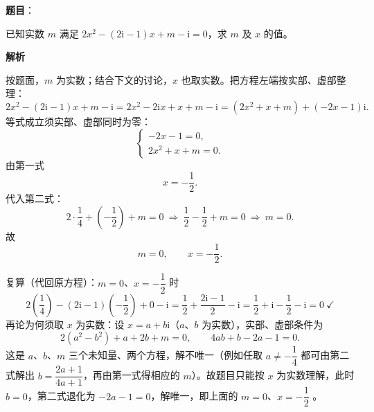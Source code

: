 \begin{answer}

\textbf{题目}：

已知实数 $m$ 满足 $2x^2-(2\mathrm i-1)x+m-\mathrm i=0$，求 $m$ 及 $x$ 的值。

\textbf{解析}

按题面，$m$ 为实数；结合下文的讨论，$x$ 也取实数。把方程左端按实部、虚部整理：
\nopagebreak[4]
\[
2x^2-(2\mathrm i-1)x+m-\mathrm i
=2x^2-2\mathrm i x+x+m-\mathrm i
=(2x^2+x+m)+(-2x-1)\mathrm i.
\]
等式成立须实部、虚部同时为零：
\nopagebreak[4]
\[
\begin{cases}
-2x-1=0,\\
2x^2+x+m=0.
\end{cases}
\]
由第一式
\nopagebreak[4]
\[
x=-\frac12.
\]
代入第二式：
\nopagebreak[4]
\[
2\cdot\frac14+\left(-\frac12\right)+m=0\ \Longrightarrow\ \frac12-\frac12+m=0\ \Longrightarrow\ m=0.
\]
故
\nopagebreak[4]
\[
m=0,\qquad x=-\frac12.
\]

复算（代回原方程）：$m=0$、$x=-\dfrac12$ 时
\nopagebreak[4]
\[
2\left(\frac14\right)-(2\mathrm i-1)\left(-\frac12\right)+0-\mathrm i
=\frac12+\frac{2\mathrm i-1}{2}-\mathrm i
=\frac12+\mathrm i-\frac12-\mathrm i=0\ \checkmark
\]
再论为何须取 $x$ 为实数：设 $x=a+b\mathrm i$（$a$、$b$ 为实数），实部、虚部条件为
\nopagebreak[4]
\[
2(a^2-b^2)+a+2b+m=0,\qquad 4ab+b-2a-1=0.
\]
这是 $a$、$b$、$m$ 三个未知量、两个方程，解不唯一（例如任取 $a\ne-\dfrac14$ 都可由第二式解出 $b=\dfrac{2a+1}{4a+1}$，再由第一式得相应的 $m$）。故题目只能按 $x$ 为实数理解，此时 $b=0$，第二式退化为 $-2a-1=0$，解唯一，即上面的 $m=0$、$x=-\dfrac12$ 。


\end{answer}
